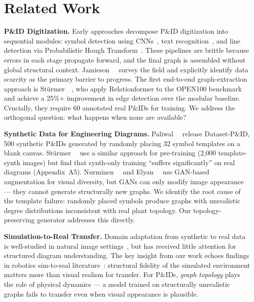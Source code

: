 
\section{Related Work}
\label{sec:related}

\noindent\textbf{P\&ID Digitization.}
Early approaches decompose P\&ID digitization into sequential modules:
symbol detection using CNNs~\cite{rahul2019,mani2020,cha2019},
text recognition~\cite{baek2019craft}, and line detection via
Probabilistic Hough Transform~\cite{stuermer2023}.
These pipelines are brittle because errors in each stage propagate
forward, and the final graph is assembled without global structural context.
Jamieson~\etal~\cite{jamieson2024} survey the field and explicitly
identify data scarcity as the primary barrier to progress.
The first end-to-end graph-extraction approach is
Stürmer~\etal~\cite{sturmer2025}, who apply Relationformer to the
OPEN100 benchmark and achieve a 25\%+ improvement in edge detection over
the modular baseline.
Crucially, they require 60 annotated real P\&IDs for training.
We address the orthogonal question: what happens when none are available?

\noindent\textbf{Synthetic Data for Engineering Diagrams.}
Paliwal~\etal~\cite{paliwal2021} release Dataset-P\&ID, 500 synthetic
P\&IDs generated by randomly placing 32 symbol templates on a blank canvas.
Stürmer~\etal~\cite{sturmer2025} use a similar approach for pre-training
(2,000 template-synth images) but find that synth-only training
``suffers significantly'' on real diagrams (Appendix~A5).
Nurminen~\etal~\cite{nurminen2020} and Elyan~\etal~\cite{elyan2020} use
GAN-based augmentation for visual diversity, but GANs can only modify
image appearance — they cannot generate structurally new graphs.
We identify the root cause of the template failure: randomly placed symbols
produce graphs with unrealistic degree distributions inconsistent with
real plant topology.
Our topology-preserving generator addresses this directly.

\noindent\textbf{Simulation-to-Real Transfer.}
Domain adaptation from synthetic to real data is well-studied in
natural image settings~\cite{tobin2017,ganin2016}, but has received
little attention for structured diagram understanding.
The key insight from our work echoes findings in robotics sim-to-real
literature~\cite{akkaya2019}: structural fidelity of the simulated
environment matters more than visual realism for transfer.
For P\&IDs, \emph{graph topology} plays the role of physical dynamics —
a model trained on structurally unrealistic graphs fails to transfer
even when visual appearance is plausible.

